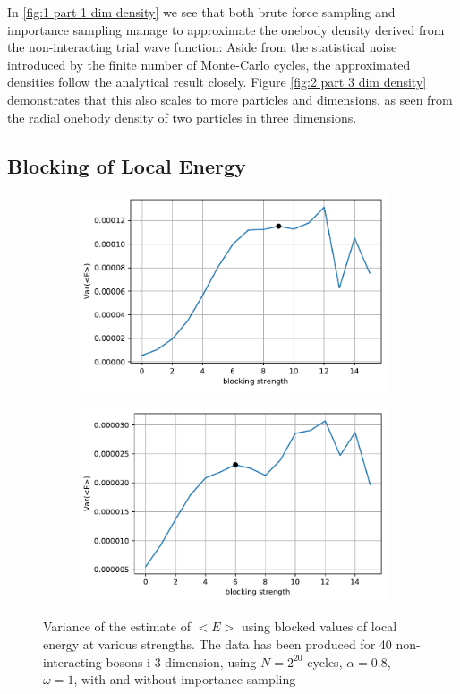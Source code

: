 In \autoref{fig:1 part 1 dim density}  we see that both brute force sampling and importance sampling manage to approximate the onebody density derived from the non-interacting trial wave function: Aside from the statistical noise introduced by the finite number of Monte-Carlo cycles, the approximated densities follow the analytical result closely. Figure \autoref{fig:2 part 3 dim density} demonstrates that this also scales to more particles and dimensions, as seen from the radial onebody density of two particles in three dimensions. 


\subsection{Blocking of Local Energy}
\begin{figure}
	\begin{subfigure}{\textwidth}
		\centering
		\includegraphics[width=.8\linewidth]{figures/blocking1.pdf}
	\end{subfigure}%
	\begin{subfigure}{\textwidth}
		\centering
		\includegraphics[width=.8\linewidth]{figures/blocking2.pdf}
	\end{subfigure}%
	\centering
	\caption{Variance of the estimate of $<E>$ using blocked values of local energy at various strengths. The data has been produced for 40 non-interacting bosons i 3 dimension, using $N = 2^{20}$ cycles, $\alpha = 0.8$, $\omega = 1$, with and without importance sampling}
	\label{fig:blocking1}
\end{figure}

